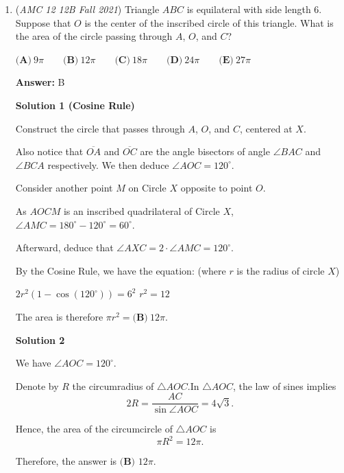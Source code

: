 \begin{enumerate}
 Hence, $\phi = 150^\circ$.

 Therefore, the answer is $\boxed{\textbf{(D) }150}$.

 


 


	\item (\textit{AMC 12 12B Fall 2021}) Triangle $ABC$ is equilateral with side length $6$. Suppose that $O$ is the center of the inscribed
circle of this triangle. What is the area of the circle passing through $A$, $O$, and $C$?


 $\textbf{(A)} \: 9\pi \qquad\textbf{(B)} \: 12\pi \qquad\textbf{(C)} \: 18\pi \qquad\textbf{(D)} \: 24\pi \qquad\textbf{(E)} \: 27\pi$

 \textbf{Answer: }B



\textbf{Solution 1 (Cosine Rule)}

Construct the circle that passes through $A$, $O$, and $C$, centered at $X$. 

 Also notice that $\overline{OA}$ and $\overline{OC}$ are the angle bisectors of angle $\angle BAC$ and $\angle BCA$ respectively. We then deduce $\angle AOC=120^\circ$.

 Consider another point $M$ on Circle $X$ opposite to point $O$. 

 As $AOCM$ is an inscribed quadrilateral of Circle $X$, $\angle AMC=180^\circ-120^\circ=60^\circ$.

 Afterward, deduce that $\angle AXC=2·\angle AMC=120^\circ$.

 By the Cosine Rule, we have the equation: (where $r$ is the radius of circle $X$)

 $2r^2(1-\cos(120^\circ))=6^2$
$r^2=12$

 The area is therefore $\pi r^2 = \boxed{\textbf{(B)}\ 12\pi}$.

 



\textbf{Solution 2}

We have $\angle AOC = 120^\circ$.

 Denote by $R$ the circumradius of $\triangle AOC$.In $\triangle AOC$, the law of sines implies
 \[ 2 R = \frac{AC}{\sin \angle AOC} = 4 \sqrt{3} . \]

 Hence, the area of the circumcircle of $\triangle AOC$ is
 \[ \pi R^2 = 12 \pi . \]

 Therefore, the answer is $\boxed{\textbf{(B) }12 \pi}$.

 




\end{enumerate}
